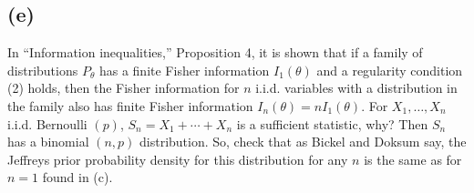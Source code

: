 \documentclass[11pt]{article}
\newcommand{\ProbS}{\iftrue}
\newcommand{\ProbE}{\fi}
\begin{document}
\subsection*{(e)}
\ProbS
In ``Information inequalities,'' Proposition 4, it is shown that if a family of distributions $P_{\theta}$ has a finite Fisher information $I_1(\theta)$ and a regularity condition (2) holds, then the Fisher information for $n$ i.i.d. variables with a distribution in the family also has finite Fisher information $I_{n}(\theta) = nI_1(\theta)$.
For $X_1, \dots, X_n$ i.i.d. Bernoulli $(p)$, $S_n = X_1 + \cdots + X_n$ is a sufficient statistic, why?
Then $S_n$ has a binomial $(n, p)$ distribution. So, check that as Bickel and Doksum say, the Jeffreys prior probability density for this distribution for any $n$ is the same as for $n=1$ found in (c).
\ProbE
\end{document}
